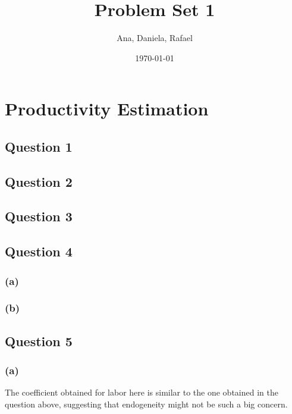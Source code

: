 \documentclass[11pt]{article}
\title{Problem Set 1}
\author{Ana, Daniela, Rafael}
\date{\today}
\begin{document}
\maketitle

\section*{Productivity Estimation}

\subsection*{Question 1}




\FloatBarrier

\newpage
\subsection*{Question 2}

\FloatBarrier

\subsection*{Question 3}

\FloatBarrier

\newpage
\subsection*{Question 4}
\subsubsection*{(a)}

\FloatBarrier

\subsubsection*{(b)}


\FloatBarrier

\subsection*{Question 5}
\subsubsection*{(a)}

\FloatBarrier
The coefficient obtained for labor here is similar to the one obtained in the question above, suggesting that endogeneity might not be such a big concern. 
\end{document}
